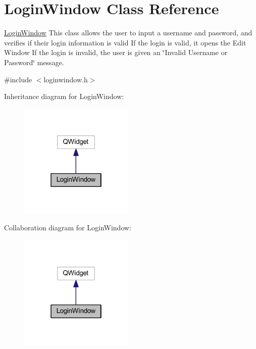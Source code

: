 \hypertarget{class_login_window}{}\section{Login\+Window Class Reference}
\label{class_login_window}


\mbox{\hyperlink{class_login_window}{Login\+Window}} This class allows the user to input a username and password, and verifies if their login information is valid If the login is valid, it opens the Edit Window If the login is invalid, the user is given an \char`\"{}\+Invalid Username or Password\char`\"{} message.  




{\ttfamily \#include $<$loginwindow.\+h$>$}



Inheritance diagram for Login\+Window\+:
\nopagebreak
\begin{figure}[H]
\begin{center}
\leavevmode
\includegraphics[width=154pt]{class_login_window__inherit__graph}
\end{center}
\end{figure}


Collaboration diagram for Login\+Window\+:
\nopagebreak
\begin{figure}[H]
\begin{center}
\leavevmode
\includegraphics[width=154pt]{class_login_window__coll__graph}
\end{center}
\end{figure}
